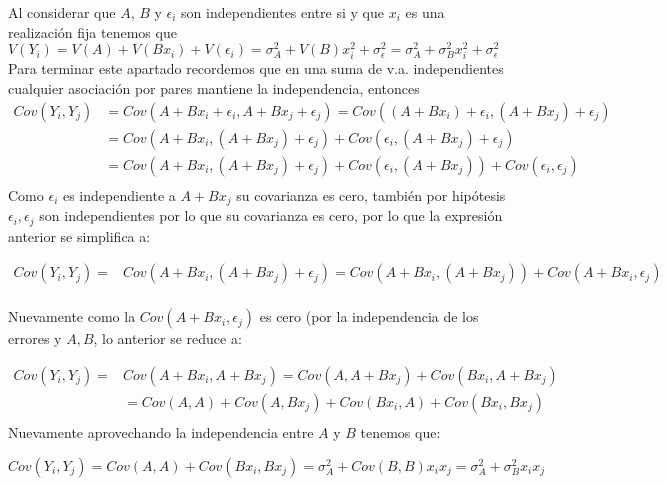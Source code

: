\documentclass[paper=letter, fontsize=11pt]{scrartcl}
\numberwithin{equation}{section} %
\numberwithin{figure}{section} %
\numberwithin{table}{section} %
\begin{document}
\begin{enumerate}
\begin{enumerate}
    Al considerar que $A$, $B$ y $\epsilon_i$ son independientes entre si y que $x_i$ es una realización fija tenemos que $V(Y_i)=V(A)+V(Bx_i) + V(\epsilon_i) = \sigma_A^2 + V(B)x_i^2 + \sigma_\epsilon^2=\sigma_A^2+\sigma_B^2x_i^2+\sigma_\epsilon^2$\\

Para terminar este apartado recordemos que en una suma de v.a. independientes cualquier asociación por pares mantiene la independencia, entonces 
\begin{equation*} 
\begin{split}
Cov(Y_i, Y_j) &=Cov(A+Bx_i + \epsilon_i, A+Bx_j + \epsilon_j)=Cov((A+Bx_i )+ \epsilon_i, (A+Bx_j) + \epsilon_j)  \\
 & =Cov(A+Bx_i , (A+Bx_j) + \epsilon_j) + Cov( \epsilon_i, (A+Bx_j) +\epsilon_j) \\
 &=  Cov(A+Bx_i , (A+Bx_j) + \epsilon_j) + Cov( \epsilon_i, (A+Bx_j) ) +Cov( \epsilon_i, \epsilon_j) \\
\end{split}
\end{equation*}
Como $\epsilon_i$ es independiente a $A + Bx_j$ su covarianza es cero, también por hipótesis $\epsilon_i,\epsilon_j$ son independientes por lo que su covarianza es cero, por lo que la expresión anterior se simplifica a:

\begin{equation*} 
\begin{split}
Cov(Y_i, Y_j) =& Cov(A+Bx_i , (A+Bx_j) + \epsilon_j) =  Cov(A+Bx_i , (A+Bx_j) ) + Cov(A+Bx_i , \epsilon_j)\\
\end{split}
\end{equation*}

Nuevamente como la $Cov(A+Bx_i, \epsilon_j)$ es cero (por la independencia de los errores y $A,B$, lo anterior se reduce a: 

\begin{equation*} 
\begin{split}
Cov(Y_i, Y_j) =&   Cov(A+Bx_i  , A+Bx_j ) = Cov(A , A+Bx_j ) + Cov(Bx_i, A+ Bx_j)\\
  & =  Cov(A, A) + Cov(A, Bx_j)+Cov(Bx_i,A)+Cov(Bx_i,Bx_j)
\\
\end{split}
\end{equation*}
Nuevamente aprovechando la independencia entre $A$ y $B$ tenemos que:

$$Cov(Y_i,Y_j)=Cov(A,A)+Cov(Bx_i,Bx_j)=\sigma_A^2+Cov(B, B)x_ix_j=\sigma_A^2+\sigma_B^2x_ix_j$$


\end{enumerate}
\end{enumerate}
\end{document}
